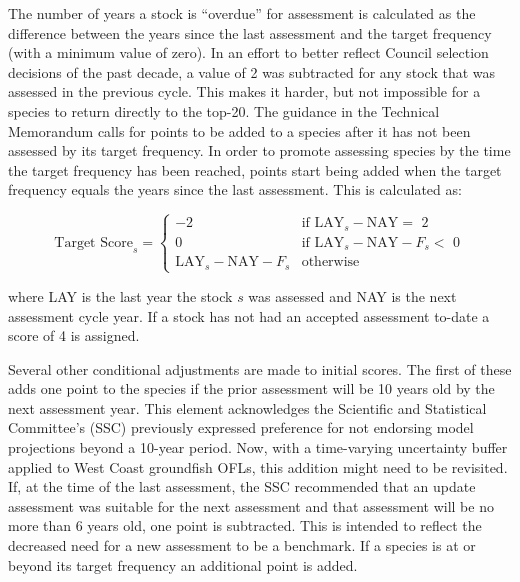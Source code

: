 \documentclass[11pt,
  english,
  a4paper,
]{article}
\begin{document}
\leavevmode\tagmcend\tagstructend\par


The number of years a stock is ``overdue'' for assessment is calculated as the difference between the years since the last assessment and the target frequency (with a minimum value of zero). In an effort to better reflect Council selection decisions of the past decade, a value of 2 was subtracted for any stock that was assessed in the previous cycle. This makes it harder, but not impossible for a species to return directly to the top-20. The guidance in the Technical Memorandum calls for points to be added to a species after it has not been assessed by its target frequency. In order to promote assessing species by the time the target frequency has been reached, points start being added when the target frequency equals the years since the last assessment. This is calculated as:

\leavevmode\tagmcend\tagstructend\par


{\[
\text{Target Score}_s = 
\begin{cases}
-2 & \text{if $\text{LAY}_{s} - \text{NAY} =$ 2}\\
0  & \text{if $\text{LAY}_{s} - \text{NAY} - F_s < $ 0}\\
\text{LAY}_{s} - \text{NAY} - F_s & \text{otherwise}
\end{cases}
\]\leavevmode\tagmcend\tagstructend}

\leavevmode\tagmcend\tagstructend\par


where LAY is the last year the stock {\(s\)\leavevmode\tagmcend\tagstructend} was assessed and NAY is the next assessment cycle year. If a stock has not had an accepted assessment to-date a score of 4 is assigned.

\leavevmode\tagmcend\tagstructend\par


Several other conditional adjustments are made to initial scores. The first of these adds one point to the species if the prior assessment will be 10 years old by the next assessment year. This element acknowledges the Scientific and Statistical Committee's (SSC) previously expressed preference for not endorsing model projections beyond a 10-year period. Now, with a time-varying uncertainty buffer applied to West Coast groundfish OFLs, this addition might need to be revisited. If, at the time of the last assessment, the SSC recommended that an update assessment was suitable for the next assessment and that assessment will be no more than 6 years old, one point is subtracted. This is intended to reflect the decreased need for a new assessment to be a benchmark. If a species is at or beyond its target frequency an additional point is added.
\end{document}

